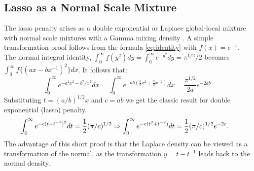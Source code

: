 \documentclass[lineno]{biometrika}
\begin{document}
\subsection{Lasso as a Normal Scale Mixture}
The lasso penalty arises as a double exponential or Laplace global-local mixture with normal scale mixtures with a Gamma mixing density \citep{andrews1974scale}. A simple transformation proof follows from the \CS formula \eqref{eq:identity} with $ f(x) = e^{-x} $. The normal integral identity, $ \int_{0}^{\infty} f(y^2) dy = \int_0^\infty e^{-y^2} d y = {\pi}^{1/2}/2 $ becomes $\int_{0}^{\infty} f\{(ax-bx^{-1})^2\} dx$. It follows that: 
$$
\int_0^\infty e^{- a^2 x^2 - b^2 / x^2 } d x = \int_0^{\infty} e^{-ab \left( \frac{a}{b} x^2 + \frac{b}{a}x^{-2} \right)} dx =  \frac{{\pi}^{1/2}}{2a} e^{- 2 ab}.
$$
Substituting $ t = (a/b)^{1/2} x $ and $c = ab$ we get the classic \citet{andrews1974scale} result for double exponential (lasso) penalty.  
\begin{align*}
  \int_0^\infty e^{- c (t - t^{-1})^2} d t & = \half (\pi/c)^{1/2} \Rightarrow \int_0^\infty e^{- c (t^2 + t^{-2})} d t = \half (\pi/c)^{1/2} e^{-2c}. %
\end{align*}
The advantage of this short proof is that the Laplace density can be viewed as a transformation of the normal, as the transformation $y = t - t^{-1}$ leads back to the normal density.
\end{document}
